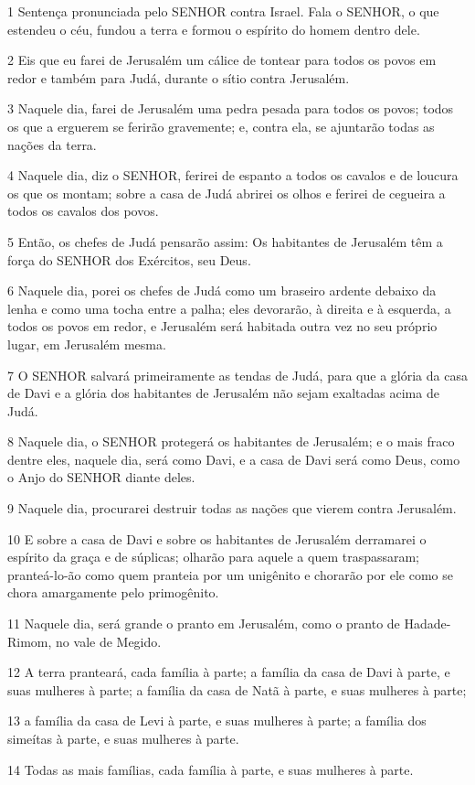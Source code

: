 \par 1 Sentença pronunciada pelo SENHOR contra Israel. Fala o SENHOR, o que estendeu o céu, fundou a terra e formou o espírito do homem dentro dele.
\par 2 Eis que eu farei de Jerusalém um cálice de tontear para todos os povos em redor e também para Judá, durante o sítio contra Jerusalém.
\par 3 Naquele dia, farei de Jerusalém uma pedra pesada para todos os povos; todos os que a erguerem se ferirão gravemente; e, contra ela, se ajuntarão todas as nações da terra.
\par 4 Naquele dia, diz o SENHOR, ferirei de espanto a todos os cavalos e de loucura os que os montam; sobre a casa de Judá abrirei os olhos e ferirei de cegueira a todos os cavalos dos povos.
\par 5 Então, os chefes de Judá pensarão assim: Os habitantes de Jerusalém têm a força do SENHOR dos Exércitos, seu Deus.
\par 6 Naquele dia, porei os chefes de Judá como um braseiro ardente debaixo da lenha e como uma tocha entre a palha; eles devorarão, à direita e à esquerda, a todos os povos em redor, e Jerusalém será habitada outra vez no seu próprio lugar, em Jerusalém mesma.
\par 7 O SENHOR salvará primeiramente as tendas de Judá, para que a glória da casa de Davi e a glória dos habitantes de Jerusalém não sejam exaltadas acima de Judá.
\par 8 Naquele dia, o SENHOR protegerá os habitantes de Jerusalém; e o mais fraco dentre eles, naquele dia, será como Davi, e a casa de Davi será como Deus, como o Anjo do SENHOR diante deles.
\par 9 Naquele dia, procurarei destruir todas as nações que vierem contra Jerusalém.
\par 10 E sobre a casa de Davi e sobre os habitantes de Jerusalém derramarei o espírito da graça e de súplicas; olharão para aquele a quem traspassaram; pranteá-lo-ão como quem pranteia por um unigênito e chorarão por ele como se chora amargamente pelo primogênito.
\par 11 Naquele dia, será grande o pranto em Jerusalém, como o pranto de Hadade-Rimom, no vale de Megido.
\par 12 A terra pranteará, cada família à parte; a família da casa de Davi à parte, e suas mulheres à parte; a família da casa de Natã à parte, e suas mulheres à parte;
\par 13 a família da casa de Levi à parte, e suas mulheres à parte; a família dos simeítas à parte, e suas mulheres à parte.
\par 14 Todas as mais famílias, cada família à parte, e suas mulheres à parte.

